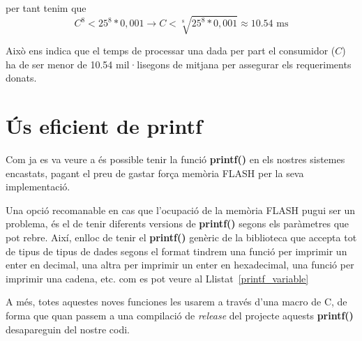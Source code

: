 per tant tenim que
\begin{equation*}
C^8 < 25^8*0,001  \rightarrow C < \sqrt[8]{25^8 * 0,001} \approx 10.54 \text{ ms}
\end{equation*}

Això ens indica que el temps de processar una dada per part el consumidor ($C$) ha de ser menor de 10.54 mil·lisegons de mitjana per assegurar els requeriments donats.



\section{Ús eficient de printf}

Com ja es va veure a  és possible tenir la funció {\bf printf()} en els nostres sistemes encastats, pagant el preu de gastar força memòria \gls{FLASH} per la seva implementació.

Una opció recomanable en cas que l'ocupació de la memòria FLASH pugui ser un problema, és el de tenir diferents versions de {\bf printf()} segons els paràmetres que pot rebre. Així, enlloc de tenir el {\bf printf()} genèric de la biblioteca que accepta tot de tipus de tipus de dades segons el format tindrem una funció per imprimir un enter en decimal, una altra per imprimir un enter en hexadecimal, una funció per imprimir una cadena, etc. com es pot veure al Llistat~\ref{printf_variable}

A més, totes aquestes noves funciones les usarem a través d'una \gls{macro} de C, de forma que quan passem a una compilació de {\em release} del projecte aquests {\bf printf()} desapareguin del nostre codi. 

